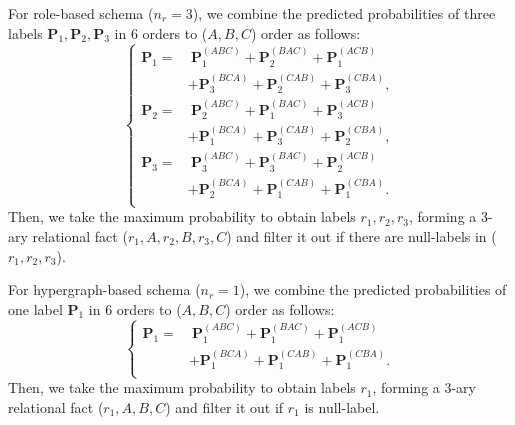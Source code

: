 \documentclass{article} \usepackage{iclr2024_conference,times}
\begin{document}
For role-based schema ($n_r=3$), we combine the predicted probabilities of three labels $\mathbf{P}_{1},\mathbf{P}_{2},\mathbf{P}_{3}$ in 6 orders to ($A,B,C$) order as follows:
\begin{equation}
\left\{
\begin{aligned}
\mathbf{P}_{1}=&\ \mathbf{P}_1^{(ABC)}+\mathbf{P}_2^{(BAC)}+\mathbf{P}_1^{(ACB)}\\
&+\mathbf{P}_3^{(BCA)}+\mathbf{P}_2^{(CAB)}+\mathbf{P}_3^{(CBA)},\\
\mathbf{P}_{2}=&\ \mathbf{P}_2^{(ABC)}+\mathbf{P}_1^{(BAC)}+\mathbf{P}_3^{(ACB)}\\
&+\mathbf{P}_1^{(BCA)}+\mathbf{P}_3^{(CAB)}+\mathbf{P}_2^{(CBA)},\\
\mathbf{P}_{3}=&\ \mathbf{P}_3^{(ABC)}+\mathbf{P}_3^{(BAC)}+\mathbf{P}_2^{(ACB)}\\
&+\mathbf{P}_2^{(BCA)}+\mathbf{P}_1^{(CAB)}+\mathbf{P}_1^{(CBA)}.\\
\end{aligned}
\right.
\end{equation}
Then, we take the maximum probability to obtain labels $r_1,r_2,r_3$, forming a 3-ary relational fact ($r_1,A,r_2,B,r_3,C$) and filter it out if there are null-labels in ($r_1,r_2,r_3$).

For hypergraph-based schema ($n_r=1$), we combine the predicted probabilities of one label $\mathbf{P}_{1}$ in 6 orders to ($A,B,C$) order as follows:
\begin{equation}
\left\{
\begin{aligned}
\mathbf{P}_{1}=&\ \mathbf{P}_1^{(ABC)}+\mathbf{P}_1^{(BAC)}+\mathbf{P}_1^{(ACB)}\\
&+\mathbf{P}_1^{(BCA)}+\mathbf{P}_1^{(CAB)}+\mathbf{P}_1^{(CBA)}.\\
\end{aligned}
\right.
\end{equation}
Then, we take the maximum probability to obtain labels $r_1$, forming a 3-ary relational fact ($r_1,A,B,C$) and filter it out if $r_1$ is null-label.
\end{document}
